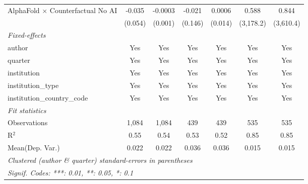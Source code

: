 \begin{tabular}{lcccccc}
   AlphaFold $\times$ Counterfactual No AI  & -0.035  & -0.0003 & -0.021    & 0.0006    & 0.588     & 0.844\\   
                                            & (0.054) & (0.001) & (0.146)   & (0.014)   & (3,178.2) & (3,610.4)\\   
   \midrule
   \emph{Fixed-effects}\\
   author                                   & Yes     & Yes     & Yes       & Yes       & Yes       & Yes\\  
   quarter                                  & Yes     & Yes     & Yes       & Yes       & Yes       & Yes\\  
   institution                              & Yes     & Yes     & Yes       & Yes       & Yes       & Yes\\  
   institution\_type                        & Yes     & Yes     & Yes       & Yes       & Yes       & Yes\\  
   institution\_country\_code               & Yes     & Yes     & Yes       & Yes       & Yes       & Yes\\  
   \midrule
   \emph{Fit statistics}\\
   Observations                             & 1,084   & 1,084   & 439       & 439       & 535       & 535\\  
   R$^2$                                    & 0.55    & 0.54    & 0.53      & 0.52      & 0.85      & 0.85\\  
Mean(Dep. Var.) & 0.022 & 0.022 & 0.036 & 0.036 & 0.015 & 0.015 \\
   \midrule \midrule
   \multicolumn{7}{l}{\emph{Clustered (author \& quarter) standard-errors in parentheses}}\\
   \multicolumn{7}{l}{\emph{Signif. Codes: ***: 0.01, **: 0.05, *: 0.1}}\\
\end{tabular}
\par\endgroup

